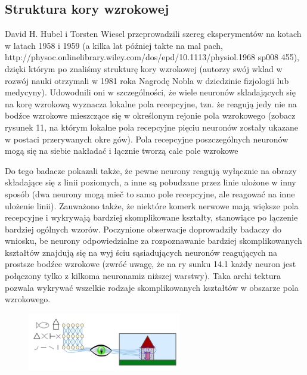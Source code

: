 \documentclass{article}
\begin{document}
\subsection{Struktura kory wzrokowej}
David H. Hubel i Torsten Wiesel przeprowadzili szereg eksperymentów na kotach w latach 1958 \cite{David_1958} i 1959 \cite{David_1959} (a kilka lat później takte na mal pach, http://physoc.onlinelibrary.wiley.com/dos/epd/10.1113/physiol.1968 sp008 455), dzięki którym po znaliśmy strukturę kory wzrokowej (autorzy swój wklad w rozwój nauki otrzymali w 1981 roka Nagrodę Nobla w dziedzinie fizjologii lub medycyny). Udowodnili oni w szczególności, że wiele neuronów skladających się na korę wzrokową wyznacza lokalne pola recepcyjne, tzn. że reagują jedy nie na bodźce wzrokowe mieszczące się w określonym rejonie pola wzrokowego (zobacz rysunek 11, na którym lokalne pola recepcyjne pięciu neuronów zostały ukazane w postaci przerywanych okre gów). Pola recepcyjne poszczególnych neuronów mogą się na siebie nakładać i łącznie tworzą cale pole wzrokowe \cite{geron}

Do tego badacze pokazali także, że pewne neurony reagują wyłącznie na obrazy składające się z linii poziomych, a inne są pobudzane przez linie ulożone w inny sposób (dwa neurony mogą mieč to samo pole recepcyjne, ale reagować na inne ulożenie linii). Zauważono także, że niektóre komerk nerwowe mają większe pola recepcyjne i wykrywają bardziej skomplikowane kształty, stanowiące po lączenie bardziej ogólnych wzorów. Poczynione obserwacje doprowadziły badaczy do wniosku, be neurony odpowiedzialne za rozpoznawanie bardziej skomplikowanych kształtów znajdują się na wyj ściu sąsiadujących neuronów reagujących na prostsze bodźce wzrokowe (zwróć uwagę, że na ry sunku 14.1 każdy neuron jest połączony tylko z kilkoma neuronamiz niższej warstwy). Taka archi tektura pozwala wykrywać wszelkie rodzaje skomplikowanych kształtów w obszarze pola wzrokowego. \cite{geron}

\begin{figure}[H]
	\centering
	\includegraphics[width=0.6\textwidth,keepaspectratio=true]{kora_wzrokowa}
	\caption{}
\end{figure}
\end{document}
